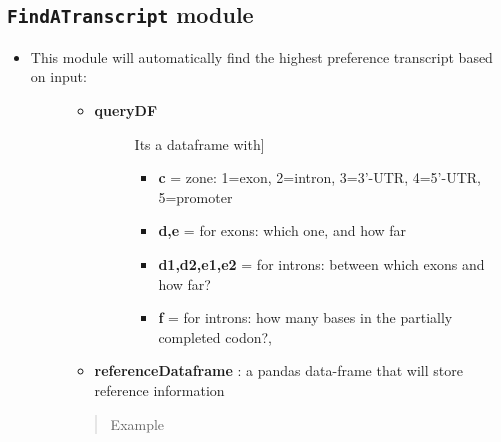 \documentclass[letterpaper,10pt,english]{sphinxmanual}
\begin{document}
\subsection{\texttt{FindATranscript} module}
\label{iAnnotateSV:findatranscript-module}\begin{itemize}
\item {} \begin{description}
\item[{This module will automatically find the highest preference transcript based on input:}] \leavevmode\begin{itemize}
\item {} \begin{description}
\item[{\textbf{queryDF}}] \leavevmode{[}Its a dataframe with{]}\begin{itemize}
\item {} 
\textbf{c} = zone: 1=exon, 2=intron, 3=3'-UTR, 4=5'-UTR, 5=promoter

\item {} 
\textbf{d,e} = for exons: which one, and how far

\item {} 
\textbf{d1,d2,e1,e2} = for introns: between which exons and how far?

\item {} 
\textbf{f} = for introns: how many bases in the partially completed codon?,

\end{itemize}

\end{description}

\item {} 
\textbf{referenceDataframe} : a pandas data-frame that will store reference information

\end{itemize}
\begin{quote}\begin{description}
\item[{Example}] \leavevmode
{}

\end{description}\end{quote}

\end{description}

\end{itemize}
\end{document}
